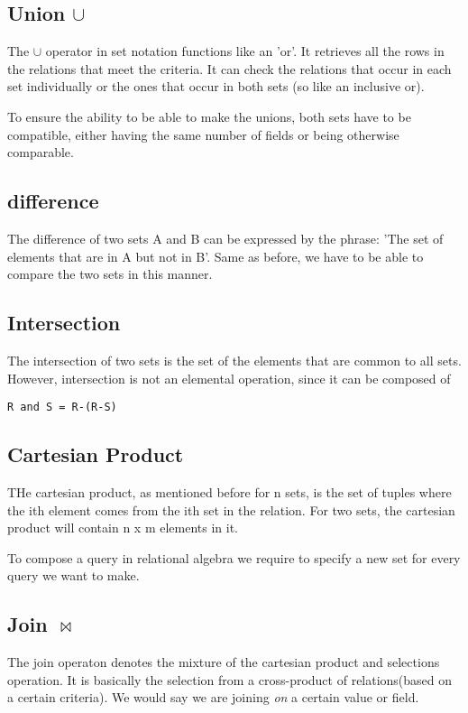 \documentclass{article}
\begin{document}
\subsection{Union $\cup$}
The $\cup$ operator in set notation functions like an 'or'. It retrieves all the rows in the relations  that meet the criteria. 
It can check the relations that occur in each set individually or the ones that occur in both sets (so like an inclusive or).

To ensure the ability to be able to make the unions, both sets have to be compatible, either having the same number of fields or
being otherwise comparable.

\subsection{difference}
The difference of two sets  A and B can be expressed by the phrase: 'The set of elements that are in A but not in B'. Same as
before, we have to be able to compare the two sets in this manner. 
\subsection{Intersection}
The intersection of two sets is the set of the elements that are common to all sets. However, intersection is not an elemental
operation, since it can be composed of
\begin{verbatim}
R and S = R-(R-S)
\end{verbatim}
\subsection{Cartesian Product}
THe cartesian product, as mentioned before for n sets, is the set of tuples where the ith element comes from the ith
set in the relation. For two sets, the cartesian product will contain n x m  elements in it.

To compose a query in relational algebra we require to specify a new set for every query we want to make.

\subsection{Join $\bowtie$}
The join operaton denotes the mixture of the cartesian product and selections operation. It is basically the selection
from a cross-product of relations(based on a certain criteria). We would say we are joining \textit{on} a certain 
value or field.
\end{document}
